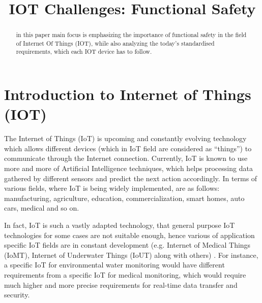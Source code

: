 \documentclass[conference]{IEEEtran}
\begin{document}
\title{IOT Challenges: Functional Safety}

\author{
}

\maketitle

\begin{abstract}
in this paper main focus is emphasizing the importance of functional safety in the field of Internet Of Things (IOT), while also analyzing the today's standardised requirements, which each IOT device has to follow.
\end{abstract}

\thispagestyle{firstpagefooter}

\section{Introduction to Internet of Things (IOT)}

The Internet of Things (IoT) \cite{alzahrani_sensing_2017} is upcoming and constantly evolving technology which allows different devices (which in IoT field are considered as “things”) to communicate through the Internet connection. Currently, IoT is known to use more and more of Artificial Intelligence techniques, which helps processing data gathered by different sensors and predict the next action accordingly. In terms of various fields, where IoT is being widely implemented, are as follows: manufacturing, agriculture, education, commercialization, smart homes, auto cars, medical and so on. 

In fact, IoT is such a vastly adapted technology, that general purpose IoT technologies for some cases are not suitable enough, hence various of application specific IoT fields are in constant development (e.g. Internet of Medical Things (IoMT), Internet of Underwater Things (IoUT) along with others) \cite{ang_application_2019}. For instance, a specific IoT for environmental water monitoring would have different requirements from a specific IoT for medical monitoring, which would require much higher and more precise requirements for real-time data transfer and security.
\end{document}

